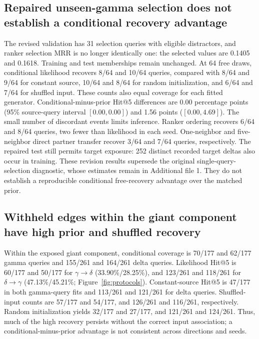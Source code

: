 \documentclass[12pt]{article}
\newcommand{\gtd}{\mbox{\ensuremath{\gamma\!\rightarrow\!\delta}}}
\newcommand{\dtg}{\mbox{\ensuremath{\delta\!\rightarrow\!\gamma}}}
\begin{document}
\subsection{Repaired unseen-gamma selection does not establish a conditional recovery advantage}
The revised validation has 31 selection queries with eligible distractors, and
ranker selection MRR is no longer identically one: the selected values are
0.1405 and 0.1618. Training and test memberships remain unchanged. At 64 free
draws, conditional likelihood recovers 8/64 and 10/64 queries, compared with
8/64 and 9/64 for constant source, 10/64 and 8/64 for random initialization,
and 6/64 and 7/64 for shuffled input. These counts also equal coverage for
each fitted generator. Conditional-minus-prior Hit@5 differences are 0.00
percentage points (95\% source-query interval $[0.00,0.00]$) and 1.56 points
($[0.00,4.69]$). The small number of discordant events limits inference.
Ranker ordering recovers 6/64 and 8/64 queries, two fewer than likelihood in
each seed. One-neighbor and five-neighbor direct partner transfer recover 3/64
and 7/64 queries, respectively. The repaired test still permits target
exposure: 252 distinct recorded target deltas also occur in training.
These revision results supersede the original single-query-selection
diagnostic, whose estimates remain in Additional file 1. They do not establish
a reproducible conditional free-recovery advantage over the matched prior.

\subsection{Withheld edges within the giant component have high prior and shuffled recovery}
Within the exposed giant component, conditional coverage is 70/177 and 62/177
gamma queries and 155/261 and 164/261 delta queries. Likelihood Hit@5 is
60/177 and 50/177 for \gtd{} (33.90\%/28.25\%), and 123/261 and 118/261 for
\dtg{} (47.13\%/45.21\%; Figure~\ref{fig:protocols}). Constant-source
Hit@5 is 47/177 in both gamma-query fits and 113/261 and 121/261 for delta
queries. Shuffled-input counts are 57/177 and 54/177, and 126/261 and 116/261,
respectively. Random initialization yields 32/177 and 27/177, and 121/261 and
124/261. Thus, much of the high recovery persists without the correct input
association; a conditional-minus-prior advantage is not consistent across
directions and seeds.
\end{document}
